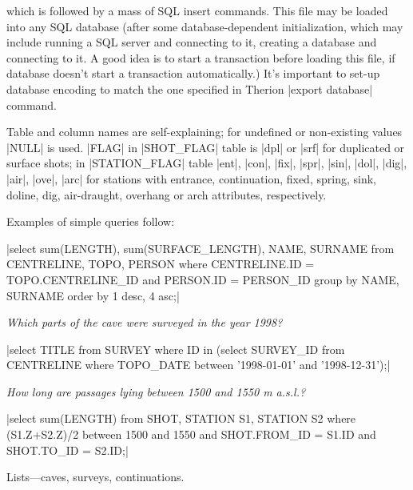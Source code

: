 which is followed by a mass of SQL insert commands. This file may be loaded 
into any SQL database (after some database-dependent initialization, which may 
include running a SQL server and connecting to it, creating a database and 
connecting to it. A good idea is to start a transaction before loading this 
file, if database doesn't start a transaction automatically.) 
It's important to set-up database encoding to match the one 
specified in Therion |export database| command.


\midinsert
    \centerline{}%
\endinsert


Table and column names are self-explaining; for undefined or non-existing 
values |NULL| is used. |FLAG| in |SHOT_FLAG| table is |dpl| or |srf| for duplicated
or surface shots; in |STATION_FLAG| table |ent|, |con|, |fix|, 
|spr|, |sin|, |dol|, |dig|, |air|, |ove|, |arc| for stations
with entrance, continuation, fixed, spring, sink, doline, dig, air-draught, 
overhang or arch attributes, respectively.

Examples of simple queries follow:


|select sum(LENGTH), sum(SURFACE_LENGTH), NAME, SURNAME 
  from CENTRELINE, TOPO, PERSON 
  where CENTRELINE.ID = TOPO.CENTRELINE_ID and PERSON.ID = PERSON_ID 
  group by NAME, SURNAME order by 1 desc, 4 asc;|

{\it Which parts of the cave were surveyed in the year 1998?}

|select TITLE from SURVEY where ID in 
  (select SURVEY_ID from CENTRELINE 
  where TOPO_DATE between '1998-01-01' and '1998-12-31');|

{\it How long are passages lying between 1500 and 1550 m a.s.l.?}

|select sum(LENGTH) from SHOT, STATION S1, STATION S2 
  where (S1.Z+S2.Z)/2 between 1500 and 1550 and 
  SHOT.FROM_ID = S1.ID and SHOT.TO_ID = S2.ID;|

\subsubchapter Lists---caves, surveys, continuations.

